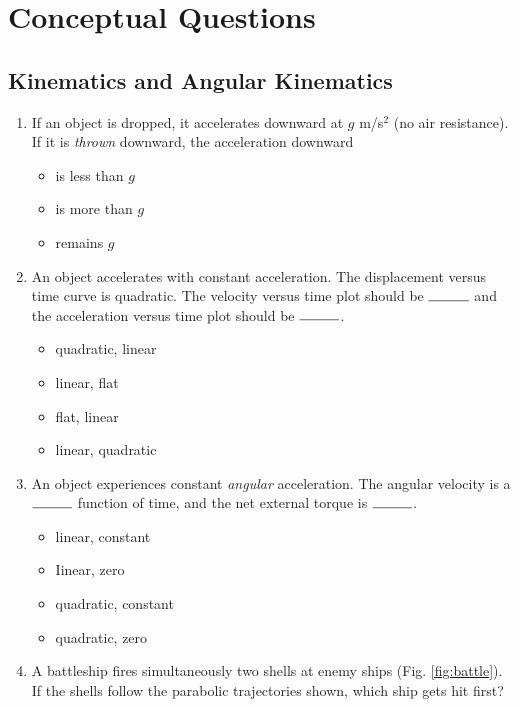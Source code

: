 \documentclass[10pt]{article}
\begin{document}
\maketitle

\section{Conceptual Questions}
\subsection{Kinematics and Angular Kinematics}
\begin{enumerate}
\item If an object is dropped, it accelerates downward at $g$ m/s$^2$ (no air resistance).  If it is \textit{thrown} downward, the acceleration downward
\begin{itemize}
\item is less than $g$
\item is more than $g$
\item remains $g$
\end{itemize}
\item An object accelerates with constant acceleration.  The displacement versus time curve is quadratic.  The velocity versus time plot should be $\rule{1cm}{0.15mm}$ and the acceleration versus time plot should be $\rule{1cm}{0.15mm}$.
\begin{itemize}
\item quadratic, linear
\item linear, flat
\item flat, linear
\item linear, quadratic
\end{itemize}
\item An object experiences constant \textit{angular} acceleration.  The angular velocity is a $\rule{1cm}{0.15mm}$ function of time, and the net external torque is $\rule{1cm}{0.15mm}$.
\begin{itemize}
\item linear, constant
\item Iinear, zero
\item quadratic, constant
\item quadratic, zero
\end{itemize}
\item A battleship fires simultaneously two shells at enemy ships (Fig. \ref{fig:battle}).  If the shells follow the parabolic trajectories shown, which ship gets hit first?
\begin{itemize}

\end{itemize}
\end{enumerate}
\end{document}
